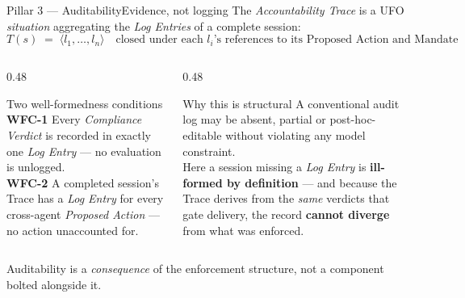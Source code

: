 \documentclass[aspectratio=169,10pt]{beamer}
\newcommand{\key}[1]{\textcolor{aiAccent}{\textbf{#1}}}
\newcommand{\cn}[1]{\textcolor{aiPrimary}{\textit{#1}}}   %
\begin{document}
\begin{frame}{Pillar 3 --- Auditability}{Evidence, not logging}
  The \cn{Accountability Trace} is a UFO \emph{situation} aggregating the
  \cn{Log Entries} of a complete session:
  \[
    T(s) \;=\; \langle l_1,\dots,l_n \rangle
    \quad\text{closed under each } l_i\text{'s references to its Proposed Action and Mandate}
  \]
  \begin{columns}[T,onlytextwidth]
    \begin{column}{0.48\textwidth}
      \begin{block}{Two well-formedness conditions}
        \small
        \textbf{WFC-1} Every \cn{Compliance Verdict} is recorded in exactly one
        \cn{Log Entry} --- no evaluation is unlogged.\\[0.4em]
        \textbf{WFC-2} A completed session's Trace has a \cn{Log Entry} for every
        cross-agent \cn{Proposed Action} --- no action unaccounted for.
      \end{block}
    \end{column}
    \begin{column}{0.48\textwidth}
      \begin{block}{Why this is structural}
        \small
        A conventional audit log may be absent, partial or post-hoc-editable
        without violating any model constraint.\\[0.4em]
        Here a session missing a \cn{Log Entry} is \key{ill-formed by definition}
        --- and because the Trace derives from the \emph{same} verdicts that gate
        delivery, the record \key{cannot diverge} from what was enforced.
      \end{block}
    \end{column}
  \end{columns}
  \vspace{0.4em}
  \begin{center}\small
    Auditability is a \emph{consequence} of the enforcement structure,
    not a component bolted alongside it.
  \end{center}
\end{frame}
\end{document}
